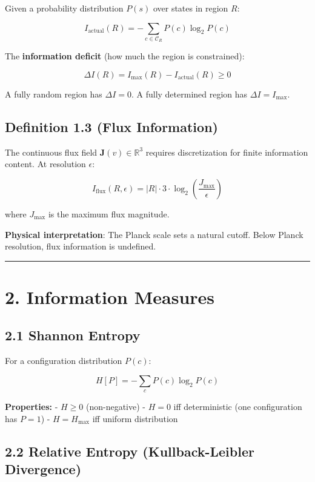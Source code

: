 \documentclass[
  11pt,
  letterpaper,
  twoside,
  openany]{book}
\makeatletter
\let\orig@section\section
\renewcommand{\section}{\needspace{8\baselineskip}\orig@section}
\let\orig@subsection\subsection
\renewcommand{\subsection}{\needspace{6\baselineskip}\orig@subsection}
\makeatother
\begin{document}
Given a probability distribution \(P(s)\) over states in region \(R\):

\[I_{\text{actual}}(R) = -\sum_{c \in \mathcal{C}_R} P(c) \log_2 P(c)\]

The \textbf{information deficit} (how much the region is constrained):

\[\Delta I(R) = I_{\text{max}}(R) - I_{\text{actual}}(R) \geq 0\]

A fully random region has \(\Delta I = 0\). A fully determined region
has \(\Delta I = I_{\text{max}}\).

\subsection{Definition 1.3 (Flux
Information)}\label{definition-1.3-flux-information}

The continuous flux field \(\mathbf{J}(v) \in \mathbb{R}^3\) requires
discretization for finite information content. At resolution
\(\epsilon\):

\[I_{\text{flux}}(R, \epsilon) = |R| \cdot 3 \cdot \log_2\left(\frac{J_{\text{max}}}{\epsilon}\right)\]

where \(J_{\text{max}}\) is the maximum flux magnitude.

\textbf{Physical interpretation}: The Planck scale sets a natural
cutoff. Below Planck resolution, flux information is undefined.

\begin{center}\rule{0.5\linewidth}{0.5pt}\end{center}

\section{2. Information Measures}\label{information-measures}

\subsection{2.1 Shannon Entropy}\label{shannon-entropy-1}

For a configuration distribution \(P(c)\):

\[H[P] = -\sum_c P(c) \log_2 P(c)\]

\textbf{Properties:} - \(H \geq 0\) (non-negative) - \(H = 0\) iff
deterministic (one configuration has \(P = 1\)) - \(H = H_{\text{max}}\)
iff uniform distribution

\subsection{2.2 Relative Entropy (Kullback-Leibler
Divergence)}\label{relative-entropy-kullback-leibler-divergence}
\end{document}
